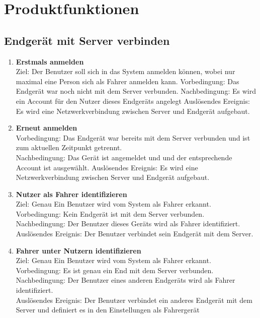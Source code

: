 \documentclass[pflichtenheft.tex]{subfiles}
\begin{document}
\chapter{Produktfunktionen}

\renewcommand{\theenumi}{/FA\ifnum \value{enumi}<10 0\fi\arabic{enumi}0/}
\renewcommand{\labelenumi}{\theenumi}
\renewcommand{\theenumii}{\arabic{enumii}}
\renewcommand{\labelenumii}{/FA\ifnum \value{enumi}<10 0\fi\arabic{enumi}\arabic{enumii}/}

\section{Endgerät mit Server verbinden}

	\begin{enumerate}
		\item{\textbf{Erstmals anmelden}} \label{firstcon}
		\\ Ziel: Der Benutzer soll sich in das System anmelden können, wobei nur maximal eine Person sich als Fahrer anmelden kann.
		Vorbedingung: Das Endgerät war noch nicht mit dem Server verbunden.
		Nachbedingung: Es wird ein Account für den Nutzer dieses Endgeräts angelegt
		Auslösendes Ereignis: Es wird eine Netzwerkverbindung zwischen Server und Endgerät aufgebaut.

		\item{\textbf{Erneut anmelden}} \label{connection}
		\\Vorbedingung: Das Endgerät war bereits mit dem Server verbunden und ist zum aktuellen Zeitpunkt getrennt. \\Nachbedingung: Das Gerät ist angemeldet und und der entsprechende Account ist ausgewählt.
		Auslösendes Ereignis: Es wird eine Netzwerkverbindung zwischen Server und Endgerät aufgebaut.

		\item{\textbf{Nutzer als Fahrer identifizieren}} \label{driver1}
		\\ Ziel: Genau Ein Benutzer wird vom System als Fahrer erkannt.  \\
		Vorbedingung: Kein Endgerät ist mit dem Server verbunden.\\
		Nachbedingung: Der Benutzer dieses Geräts wird als Fahrer identifiziert. \\
		Auslösendes Ereignis: Der Benutzer verbindet sein Endgerät mit dem Server.

		\item{\textbf{Fahrer unter Nutzern identifizieren}} \label{driver2}
		\\ Ziel: Genau Ein Benutzer wird vom System als Fahrer erkannt.  \\
		Vorbedingung: Es ist genau ein End mit dem Server verbunden.\\
		Nachbedingung: Der Benutzer eines anderen Endgeräts wird als Fahrer identifiziert. \\
		Auslösendes Ereignis: Der Benutzer verbindet ein anderes Endgerät mit dem Server und definiert es in den Einstellungen als Fahrergerät

		\setcounter{enumTemp}{\value{enumi}}
		

	\end{enumerate}
	
\end{document}

